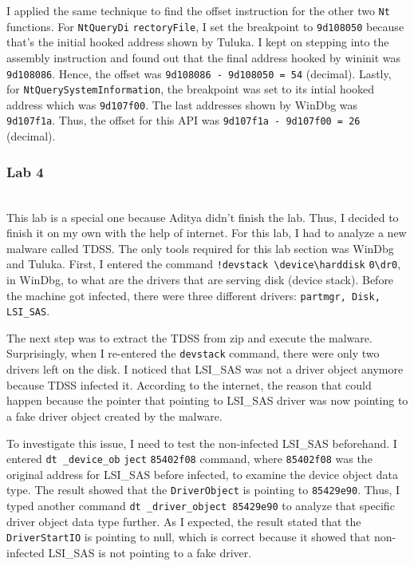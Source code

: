 \documentclass[letterpaper,10pt,titlepage,draftclsnofoot,onecolumn]{IEEEtran}
\begin{document}
I applied the same technique to find the offset instruction for the other two \verb|Nt| functions.
For \verb|NtQueryDi| \verb|rectoryFile|, I set the breakpoint to \verb|9d108050| because that's the initial hooked address shown by Tuluka.
I kept on stepping into the assembly instruction and found out that the final address hooked by wininit was \verb|9d108086|.
Hence, the offset was \verb|9d108086 - 9d108050 = 54| (decimal).
Lastly, for \verb|NtQuerySystemInformation|, the breakpoint was set to its intial hooked address which was \verb|9d107f00|.
The last addresses shown by WinDbg was \verb|9d107f1a|.
Thus, the offset for this API was \verb|9d107f1a - 9d107f00 = 26| (decimal).
\hfill\\
\subsubsection{Lab 4}
\hfill\\

This lab is a special one because Aditya didn't finish the lab.
Thus, I decided to finish it on my own with the help of internet.
For this lab, I had to analyze a new malware called TDSS.
The only tools required for this lab section was WinDbg and Tuluka.
First, I entered the command \verb|!devstack \device\harddisk| \verb|0\dr0|, in WinDbg, to what are the drivers that are serving disk (device stack). 
Before the machine got infected, there were three different drivers: \verb|partmgr, Disk, LSI_SAS|.

The next step was to extract the TDSS from zip and execute the malware.
Surprisingly, when I re-entered the \verb|devstack| command, there were only two drivers left on the disk. 
I noticed that LSI\_SAS was not a driver object anymore because TDSS infected it.
According to the internet, the reason that could happen because the pointer that pointing to LSI\_SAS driver was now pointing to a fake driver object created by the malware.

To investigate this issue, I need to test the non-infected LSI\_SAS beforehand. 
I entered \verb|dt _device_ob| \verb|ject| \verb|85402f08| command, where \verb|85402f08| was the original address for LSI\_SAS before infected, to examine the device object data type.
The result showed that the \verb|DriverObject| is pointing to \verb|85429e90|.
Thus, I typed another command \verb|dt _driver_object 85429e90| to analyze that specific driver object data type further.
As I expected, the result stated that the \verb|DriverStartIO| is pointing to null, which is correct because it showed that non-infected LSI\_SAS is not pointing to a fake driver.
\end{document}
